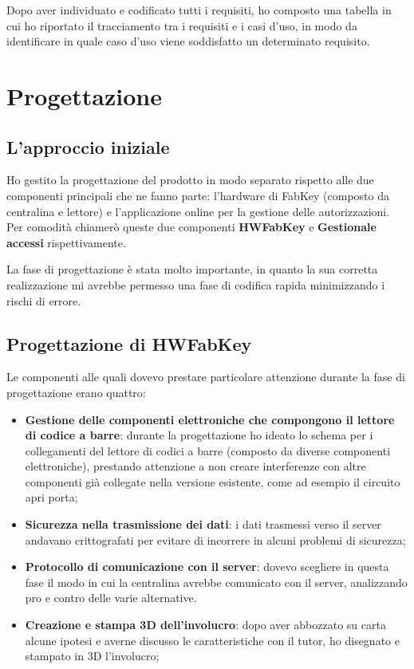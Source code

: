 Dopo aver individuato e codificato tutti i requisiti, ho composto una tabella in cui ho riportato il tracciamento tra i requisiti e i casi d'uso, in modo da identificare in quale caso d'uso viene soddisfatto un determinato requisito.

\section{Progettazione}
\subsection{L'approccio iniziale}
Ho gestito la progettazione del prodotto in modo separato rispetto alle due componenti principali che ne fanno parte: l'hardware di FabKey (composto da centralina e lettore) e l'applicazione online per la gestione delle autorizzazioni. Per comodità chiamerò queste due componenti \textbf{HWFabKey} e \textbf{Gestionale accessi} rispettivamente.

\medskip

La fase di progettazione è stata molto importante, in quanto la sua corretta realizzazione mi avrebbe permesso una fase di codifica rapida minimizzando i rischi di errore.

\bigskip

\subsection{Progettazione di HWFabKey}

Le componenti alle quali dovevo prestare particolare attenzione durante la fase di progettazione erano quattro:
\begin{itemize}
\item \textbf{Gestione delle componenti elettroniche che compongono il lettore di codice a barre}: durante la progettazione ho ideato lo schema per i collegamenti del lettore di codici a barre (composto da diverse componenti elettroniche), prestando attenzione a non creare interferenze con altre componenti già collegate nella versione esistente, come ad esempio il circuito apri porta;
\item \textbf{Sicurezza nella trasmissione dei dati}: i dati trasmessi verso il server andavano crittografati per evitare di incorrere in alcuni problemi di sicurezza;
\item \textbf{Protocollo di comunicazione con il server}: dovevo scegliere in questa fase il modo in cui la centralina avrebbe comunicato con il server, analizzando pro e contro delle varie alternative.
\item \textbf{Creazione e stampa 3D dell'involucro}: dopo aver abbozzato su carta alcune ipotesi e averne discusso le caratteristiche con il tutor, ho disegnato e stampato in 3D l'involucro;
\end{itemize}

